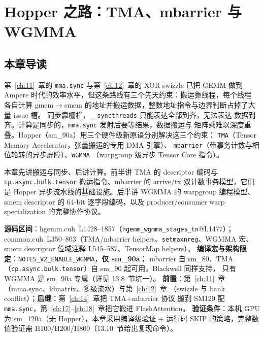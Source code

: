 \chapter{Hopper 之路：TMA、mbarrier 与 WGMMA}\label{ch:13}

\section{本章导读}

第~\ref{ch:11}~章的 \texttt{mma.sync} 与第~\ref{ch:12}~章的 XOR swizzle 已把 GEMM 做到
Ampere 时代的效率水平，但这条路线有三个先天约束：搬运靠线程，每个线程
各自计算 gmem$\to$smem 的地址并搬运数据，整数地址指令与边界判断占掉了大量 issue 槽。
同步靠栅栏，\texttt{\_\allowbreak{}\_\allowbreak{}syncthreads} 只能表达全部到齐，无法表达
数据到齐。计算是同步的，\texttt{mma.sync} 发射后要等结果，数据搬运与
矩阵乘难以深度重叠。Hopper（sm\_90a）用三个硬件级新原语分别解决这三个约束：
\texttt{TMA}（Tensor Memory Accelerator，张量搬运的专用 DMA 引擎）、
\texttt{mbarrier}（带事务计数与相位轮转的异步屏障）、\texttt{WGMMA}
（warpgroup 级异步 Tensor Core 指令）。

本章先讲搬运与同步、后讲计算。前半讲 TMA 的 descriptor 编码与
\texttt{cp.\allowbreak{}async.\allowbreak{}bulk.\allowbreak{}tensor} 搬运指令、mbarrier 的 arrive/tx
双计数事务模型，它们是 Hopper 异步流水线的基础设施。后半讲 WGMMA 的 warpgroup
编程模型、smem descriptor 的 64-bit 逐字段编码，以及 producer/consumer
warp specialization 的完整协作协议。

\textbf{源码区间}：hgemm.cuh~L1428--1857（\texttt{hgemm\_\allowbreak{}wgmma\_\allowbreak{}stages\_\allowbreak{}tn}@L1477）；
common.cuh~L350--803（TMA/mbarrier helpers、\texttt{setmaxnreg}、WGMMA 宏、
smem descriptor 位域注释 L545--587、TensorMap helpers）。
\textbf{编译宏与架构限定}：\texttt{NOTES\_\allowbreak{}V2\_\allowbreak{}ENABLE\_\allowbreak{}WGMMA}，\textbf{仅 sm\_90a}；
mbarrier 自 sm\_80、TMA（\texttt{cp.async.bulk.tensor}）自 sm\_90 起可用，Blackwell 同样支持，
只有 WGMMA 是 sm\_90a 专属（详见 13.8~节坑一）。
\textbf{前置}：第~\ref{ch:11}~章（mma.sync、ldmatrix、多级流水）与第~\ref{ch:12}~章
（swizzle 与 bank conflict）；\textbf{后继}：第~\ref{ch:14}~章把 TMA+mbarrier 协议
搬到 SM120 配 \texttt{mma.sync}，第~\ref{ch:17}--\ref{ch:18}~章把它搬进 FlashAttention。
\textbf{验证条件}：本机 GPU 为 sm\_120a（无 Hopper），本章采用编译级验证 + 运行时
SKIP 的策略，完整数值验证需 H100/H200/H800（13.10~节给出复现命令）。

